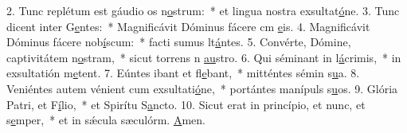2. Tunc replétum est gáudio os n\uline{o}strum:~* et lingua nostra exsultat\uline{ó}ne.
3. Tunc dicent inter G\uline{e}ntes:~* Magnificávit Dóminus fácere cm \uline{e}is.
4. Magnificávit Dóminus fácere nob\uline{í}scum:~* facti sumus lt\uline{á}ntes.
5. Convérte, Dómine, captivitátem n\uline{o}stram,~* sicut torrens n \uline{au}stro.
6. Qui séminant in l\uline{á}crimis,~* in exsultatión m\uline{e}tent.
7. Eúntes ibant et fl\uline{e}bant,~* mitténtes sémin s\uline{u}a.
8. Veniéntes autem vénient cum exsultati\uline{ó}ne,~* portántes manípuls s\uline{u}os.
9. Glória Patri, et F\uline{í}lio,~* et Spirítu S\uline{a}ncto.
10. Sicut erat in princípio, et nunc, et s\uline{e}mper,~* et in sǽcula sæculórm. \uline{A}men.
